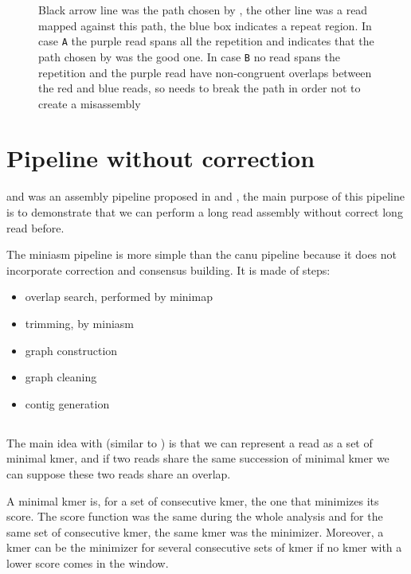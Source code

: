 \documentclass[main]{subfiles}
\begin{document}
\begin{figure}[ht]
    \centering
    
    \caption{Black arrow line was the path chosen by \canu, the other line was a read mapped against this path, the blue box indicates a repeat region. In case \texttt{A} the purple read spans all the repetition and indicates that the path chosen by \canu was the good one. In case \texttt{B} no read spans the repetition and the purple read have non-congruent overlaps between the red and blue reads, so \canu needs to break the path in order not to create a misassembly}
    \label{sota:fig:canu:remapping}
\end{figure}

\section{Pipeline without correction \miniasm} \label{section:sota:miniasm}

\minimap and \miniasm was an assembly pipeline proposed in \cite{miniasm_minimap} and \cite{minimap2}, the main purpose of this pipeline is to demonstrate that we can perform a long read assembly without correct long read before.

The miniasm pipeline is more simple than the canu pipeline because it does not incorporate correction and consensus building. It is made of steps:
\begin{itemize}
    \item overlap search, performed by minimap
    \item trimming, by miniasm
    \item graph construction 
    \item graph cleaning
    \item contig generation
\end{itemize}


\subsection{\minimap} \label{subsec:sota:miniasm:minimap}

The main idea with \minimap (similar to \mhap) is that we can represent a read as a set of minimal kmer, and if two reads share the same succession of minimal kmer we can suppose these two reads share an overlap.

A minimal kmer is, for a set of consecutive kmer, the one that minimizes its score. The score function was the same during the whole analysis and for the same set of consecutive kmer, the same kmer was the minimizer. Moreover, a kmer can be the minimizer for several consecutive sets of kmer if no kmer with a lower score comes in the window. 
\end{document}
